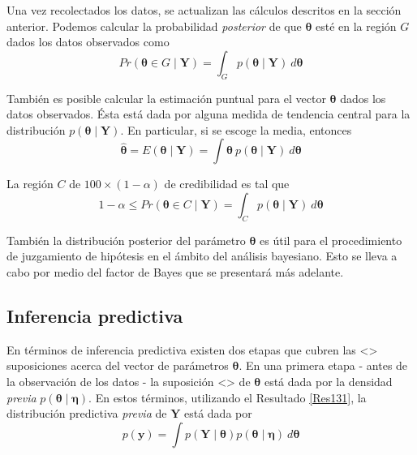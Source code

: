 \documentclass[
  spanish,
  letter]{book}
\theoremstyle{definition}
\theoremstyle{definition}
\theoremstyle{definition}
\theoremstyle{remark}
\begin{document}
Una vez recolectados los datos, se actualizan las cálculos descritos en la sección anterior. Podemos calcular la probabilidad \emph{posterior} de que \(\boldsymbol \theta\) esté en la región \(G\) dados los datos observados como
\begin{equation}
Pr(\boldsymbol \theta\in G  \mid \mathbf{Y})=\int_G p(\boldsymbol \theta\mid \mathbf{Y})\ d\boldsymbol \theta
\end{equation}

También es posible calcular la estimación puntual para el vector \(\boldsymbol \theta\) dados los datos observados. Ésta está dada por alguna medida de tendencia central para la distribución \(p(\boldsymbol \theta\mid \mathbf{Y})\). En particular, si se escoge la media, entonces
\begin{equation}
\hat{\boldsymbol \theta}=E(\boldsymbol \theta\mid \mathbf{Y})=\int \boldsymbol \theta\ p(\boldsymbol \theta\mid \mathbf{Y})\ d\boldsymbol \theta
\end{equation}

La región \(C\) de \(100\times(1-\alpha)%
\) de credibilidad es tal que
\begin{equation}
1-\alpha \leq Pr(\boldsymbol \theta\in C \mid \mathbf{Y})=\int_Cp(\boldsymbol \theta\mid \mathbf{Y})\ d\boldsymbol \theta
\end{equation}

También la distribución posterior del parámetro \(\boldsymbol \theta\) es útil para el procedimiento de juzgamiento de hipótesis en el ámbito del análisis bayesiano. Esto se lleva a cabo por medio del factor de Bayes que se presentará más adelante.

\hypertarget{inferencia-predictiva}{%
\subsection{Inferencia predictiva}\label{inferencia-predictiva}}

En términos de inferencia predictiva existen dos etapas que cubren las \textless{}\textgreater{} suposiciones acerca del vector de parámetros \(\boldsymbol \theta\). En una primera etapa - antes de la observación de los datos - la suposición \textless{}\textgreater{} de \(\boldsymbol \theta\) está dada por la densidad \emph{previa} \(p(\boldsymbol \theta\mid \boldsymbol \eta)\). En estos términos, utilizando el Resultado \ref{Res131}, la distribución predictiva \emph{previa} de \(\mathbf{Y}\) está dada por
\begin{equation}
p(\mathbf{y})=\int p(\mathbf{Y} \mid \boldsymbol \theta)p(\boldsymbol \theta\mid \boldsymbol \eta)\ d\boldsymbol \theta
\end{equation}
\end{document}
